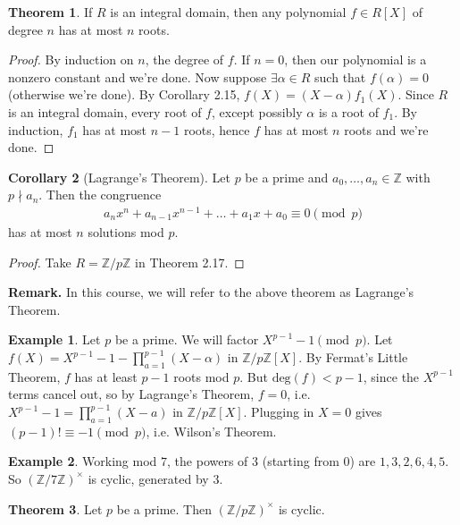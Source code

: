 \documentclass{article}
\theoremstyle{definition}
\newtheorem{theorem}{Theorem}[section]
\newtheorem{cor}[theorem]{Corollary}
\newtheorem{example}{Example}[section]
\begin{document}
\begin{theorem} %
    If $R$ is an integral domain, then any polynomial $f \in R[X]$ of degree $n$ has at most $n$ roots.
\end{theorem}
\begin{proof}
    By induction on $n$, the degree of $f$. If $n=0$, then our polynomial is a nonzero constant and we're done. Now suppose $\exists \alpha \in R$ such that $f(\alpha)=0$ (otherwise we're done). By Corollary 2.15, $f(X) = (X-\alpha)f_1(X)$. Since $R$ is an integral domain, every root of $f$, except possibly $\alpha$ is a root of $f_1$. By induction, $f_1$ has at most $n-1$ roots, hence $f$ has at most $n$ roots and we're done.
\end{proof}
\begin{cor}[Lagrange's Theorem]
    Let $p$ be a prime and $a_0,\ldots,a_n \in \mathbb{Z}$ with $p \nmid a_n$. Then the congruence 
    \begin{align*}
        a_nx^n + a_{n-1}x^{n-1} + \ldots + a_1x + a_0 \equiv 0 \pmod{p}
    \end{align*}
    has at most $n$ solutions mod $p$.
\end{cor}
\begin{proof}
    Take $R=\mathbb{Z}/p\mathbb{Z}$ in Theorem 2.17.
\end{proof}
\textbf{Remark.} In this course, we will refer to the above theorem as Lagrange's Theorem.
\begin{example}
    Let $p$ be a prime. We will factor $X^{p-1}- 1 \pmod{p}$. Let $f(X) = X^{p-1}-1 - \prod_{a=1}^{p-1}(X-\alpha)$ in $\mathbb{Z}/p\mathbb{Z}[X]$. By Fermat's Little Theorem, $f$ has at least $p-1$ roots mod $p$. But $\text{deg}(f) < p-1$, since the $X^{p-1}$ terms cancel out, so by Lagrange's Theorem, $f = 0$, i.e. $X^{p-1} -1 = \prod_{a=1}^{p-1} (X-a)$ in $\mathbb{Z}/p\mathbb{Z}[X]$. Plugging in $X=0$ gives $(p-1)! \equiv -1 \pmod{p}$, i.e. Wilson's Theorem.
\end{example}
\begin{example}
    Working mod $7$, the powers of $3$ (starting from 0) are $1,3,2,6,4,5$. So $(\mathbb{Z}/7\mathbb{Z})^{\times}$ is cyclic, generated by $3$.
\end{example}
\begin{theorem}%
    Let $p$ be a prime. Then $(\mathbb{Z}/p\mathbb{Z})^{\times}$ is cyclic.
\end{theorem}
\end{document}
